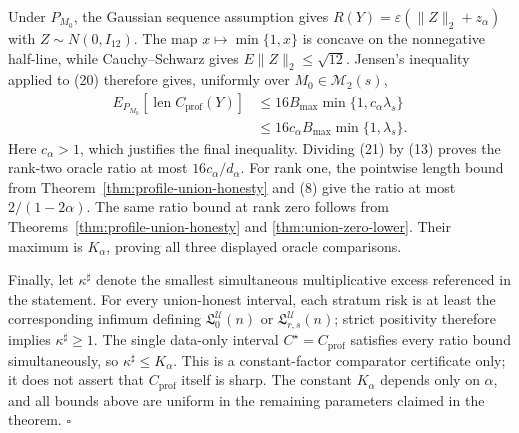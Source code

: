 Under \(P_{M_0}\), the Gaussian sequence assumption gives
\(R(Y)=\varepsilon(\lVert Z\rVert_2+z_\alpha)\) with
\(Z\sim N(0,I_{12})\).  The map \(x\mapsto\min\{1,x\}\) is concave on
the nonnegative half-line, while Cauchy--Schwarz gives
\(E\lVert Z\rVert_2\leq\sqrt{12}\).  Jensen's inequality applied to (20)
therefore gives, uniformly over \(M_0\in\mathcal M_2(s)\),
\[
 \begin{split}
 E_{P_{M_0}}[\operatorname{len}C_{\mathrm{prof}}(Y)]
 &\leq16B_{\max}\min\{1,c_\alpha\lambda_s\}\\
 &\leq16c_\alpha B_{\max}\min\{1,\lambda_s\}.
 \end{split}
\tag{21}
\]
Here \(c_\alpha>1\), which justifies the final inequality.  Dividing (21)
by (13) proves the rank-two oracle ratio at most
\(16c_\alpha/d_\alpha\).  For rank one, the pointwise length bound from
Theorem~\ref{thm:profile-union-honesty} and (8) give the ratio at most
\(2/(1-2\alpha)\).  The same ratio bound at rank zero follows from
Theorems~\ref{thm:profile-union-honesty} and
\ref{thm:union-zero-lower}.  Their maximum is \(K_\alpha\), proving all
three displayed oracle comparisons.

Finally, let \(\kappa^\sharp\) denote the smallest simultaneous
multiplicative excess referenced in the statement.  For every union-honest
interval, each stratum risk is at least the corresponding infimum defining
\(\mathfrak L_0^{\mathcal U}(n)\) or
\(\mathfrak L_{r,s}^{\mathcal U}(n)\); strict positivity therefore implies
\(\kappa^\sharp\geq1\).  The single data-only interval
\(C^\star=C_{\mathrm{prof}}\) satisfies every ratio bound simultaneously,
so \(\kappa^\sharp\leq K_\alpha\).  This is a constant-factor comparator
certificate only; it does not assert that \(C_{\mathrm{prof}}\) itself is
sharp.  The constant \(K_\alpha\) depends only on \(\alpha\), and all bounds
above are uniform in the remaining parameters claimed in the theorem.
\(\square\)
